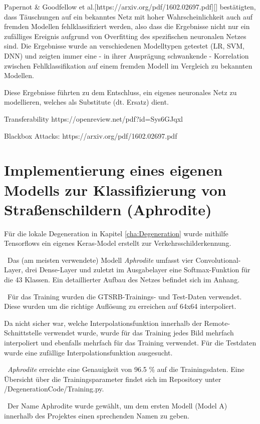 Papernot \& Goodfellow et al.[https://arxiv.org/pdf/1602.02697.pdf][] bestätigten, dass Täuschungen auf ein bekanntes Netz mit hoher Wahrscheinlichkeit auch auf fremden Modellen fehlklassifiziert werden, also dass die Ergebnisse nicht nur ein zufälliges Ereignis aufgrund von Overfitting des spezifischen neuronalen Netzes sind. Die Ergebnisse wurde an verschiedenen Modelltypen getestet (LR, SVM, DNN) und zeigten immer eine - in ihrer Ausprägung schwankende - Korrelation zwischen Fehlklassifikation auf einem fremden Modell im Vergleich zu bekannten Modellen. 

Diese Ergebnisse führten zu dem Entschluss, ein eigenes neuronales Netz zu modellieren, welches als Substitute (dt. Ersatz) dient.

Transferability https://openreview.net/pdf?id=Sys6GJqxl

Blackbox Attacks: https://arxiv.org/pdf/1602.02697.pdf

\section{Implementierung eines eigenen Modells zur Klassifizierung von Straßenschildern (Aphrodite)}
Für die lokale Degeneration in Kapitel \ref{cha:Degeneration} wurde mithilfe Tensorflows ein eigenes Keras-Model erstellt zur Verkehrsschilderkennung. 

~\newline Das (am meisten verwendete) Modell \textit{Aphrodite} umfasst vier Convolutional-Layer, drei Dense-Layer und zuletzt im Ausgabelayer eine Softmax-Funktion für die 43 Klassen. Ein detaillierter Aufbau des Netzes befindet sich im Anhang.

~\newline Für das Training wurden die GTSRB-Trainings- und Test-Daten verwendet. Diese wurden um die richtige Auflösung zu erreichen auf 64x64 interpoliert. 

Da nicht sicher war, welche Interpolationsfunktion innerhalb der Remote-Schnittstelle verwendet wurde, wurde für das Training jedes Bild mehrfach interpoliert und ebenfalls mehrfach für das Training verwendet. Für die Testdaten wurde eine zufällige Interpolationsfunktion ausgesucht. 

~\newline \textit{Aphrodite} erreichte eine Genauigkeit von 96.5 \% auf die Trainingsdaten. Eine Übersicht über die Trainingsparameter findet sich im Repository unter /DegenerationCode/Training.py. 

~\newline Der Name Aphrodite wurde gewählt, um dem ersten Modell (Model A) innerhalb des Projektes einen sprechenden Namen zu geben.

